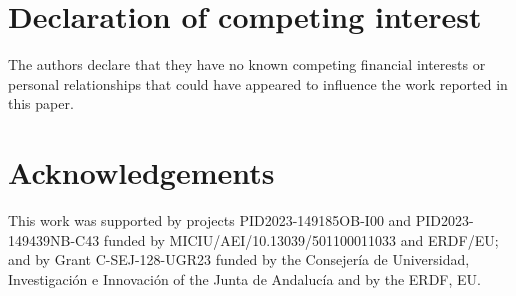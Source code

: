 \documentclass[a4paper,fleqn]{cas-sc}
\begin{document}
\section*{Declaration of competing interest}
The authors declare that they have no known competing financial interests or personal relationships that could have appeared to influence the work reported in this paper.

\section*{Acknowledgements}

This work was supported by projects PID2023-149185OB-I00 and PID2023-149439NB-C43 funded by MICIU/AEI/10.13039/501100011033 and ERDF/EU; and by Grant C-SEJ-128-UGR23 funded by the Consejería de Universidad, Investigación e Innovación of the Junta de Andalucía and by the ERDF, EU.



%
%



\end{document}
